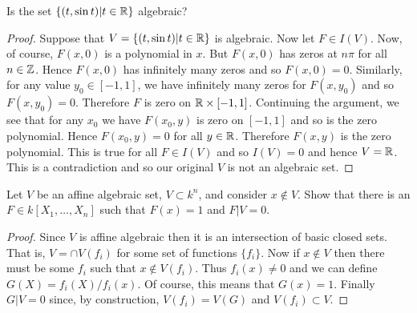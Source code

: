 \documentclass{article}
\begin{document}
\begin{problem}
  Is the set $\{(t,\sin t)|t\in\mathbb{R}\}$ algebraic? %
  \begin{proof}
    Suppose that $V=\{(t,\sin t)|t\in\mathbb{R}\}$ is algebraic. Now let $F\in I(V)$.
    Now, of course, $F(x,0)$ is a polynomial in $x$. But $F(x,0)$ has zeros at
    $n\pi$ for all $n\in\mathbb{Z}$. Hence $F(x,0)$ has infinitely many zeros and so
    $F(x,0)=0$. Similarly, for any value $y_0\in[-1,1]$, we have infinitely many
    zeros for $F(x,y_0)$ and so $F(x,y_0)=0$. Therefore $F$ is zero on
    $\mathbb{R}\times[-1,1]$. Continuing the argument, we see that for any $x_0$ we
    have $F(x_0,y)$ is zero on $[-1,1]$ and so is the zero polynomial. Hence
    $F(x_0,y)=0$ for all $y\in\mathbb{R}$. Therefore $F(x,y)$ is the zero polynomial.
    This is true for all $F\in I(V)$ and so $I(V)=0$ and hence $V=\mathbb{R}$. This is
    a contradiction and so our original $V$ is not an algebraic set.
  \end{proof}
\end{problem}

\begin{problem}
  Let $V$ be an affine algebraic set, $V\subset k^n$, and consider $x\notin
  V$. Show that there is an $F\in k[X_1,\dots,X_n]$ such that $F(x)=1$ and
  $F|V=0$.
  \begin{proof}
    Since $V$ is affine algebraic then it is an intersection of basic
    closed sets. That is, $V=\cap V(f_i)$ for some set of functions
    $\{f_i\}$. Now if $x\notin V$ then there must be some $f_i$ such that
    $x\notin V(f_i)$. Thus $f_i(x)\ne0$ and we can define
    $G(X)=f_i(X)/f_i(x)$. Of course, this means that $G(x)=1$. Finally
    $G|V=0$ since, by construction, $V(f_i)=V(G)$ and $V(f_i)\subset V$.
  \end{proof}
\end{problem}
\end{document}

